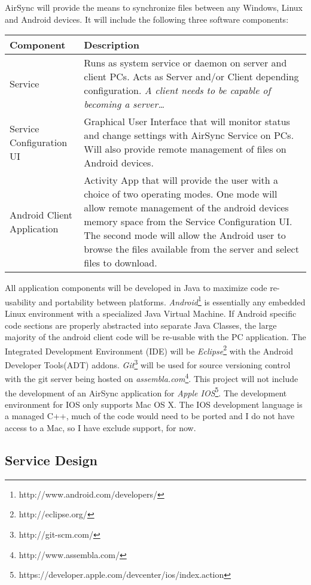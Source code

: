 \documentclass[12pt,draft]{article}
\begin{document}
AirSync will provide the means to synchronize files between any Windows, Linux and Android devices. It will include the following three software components: 
\normalsize
\begin{center}
\begin{tabular}{|l|p{7.5cm}|}
\hline
	\textbf{Component} & \textbf{Description} \\
\hline
	Service 
	& Runs as system service or daemon on server and client PCs. Acts as Server and/or Client depending configuration. \emph{A client needs to be capable of becoming a server\ldots} \\
\hline 
	Service Configuration UI & Graphical User Interface that will monitor status and change settings with AirSync Service on PCs. Will also provide remote management of files on Android devices.\\
\hline
	Android Client Application & Activity App that will provide the user with a choice of two operating modes. One mode will allow remote management of the android devices memory space from the Service Configuration UI. The second mode will allow the Android user to browse the files available from the server and select files to download.\\
\hline
\end{tabular}
\end{center}
\normalsize
All application components will be developed in Java to maximize code re-usability and portability between platforms. \emph{Android}\footnote{http://www.android.com/developers/} is essentially any embedded Linux environment with a specialized Java Virtual Machine. If Android specific code sections are properly abstracted into separate Java Classes, the large majority of the android client code will be re-usable with the PC application. The Integrated Development Environment (IDE) will be \emph{Eclipse}\footnote{http://eclipse.org/} with the Android Developer Tools(ADT) addons. \emph{Git}\footnote{http://git-scm.com/} will be used for source versioning control with the git server being hosted on \emph{assembla.com}\footnote{http://www.assembla.com/}. This project will not include the development of an AirSync application for \emph{Apple IOS}\footnote{https://developer.apple.com/devcenter/ios/index.action}. The development environment for IOS only supports Mac OS X. The IOS development language is a managed C++, much of the code would need to be ported and I do not have access to a Mac, so I have exclude support, for now.

\subsection{Service Design}
\end{document}
